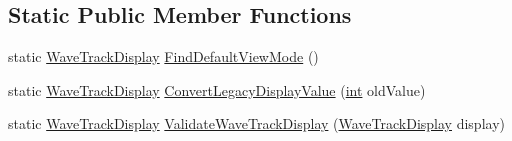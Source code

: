\subsection*{Static Public Member Functions}
\begin{DoxyCompactItemize}
\item 
static \hyperlink{class_wave_track_a084eba52413a5cc74d2634b36e2f85b5}{Wave\+Track\+Display} \hyperlink{class_wave_track_a92b3b5c624dbac625e25d5335afcd7a5}{Find\+Default\+View\+Mode} ()
\item 
static \hyperlink{class_wave_track_a084eba52413a5cc74d2634b36e2f85b5}{Wave\+Track\+Display} \hyperlink{class_wave_track_a7129f7e9044f717d60ae824d3ab156fc}{Convert\+Legacy\+Display\+Value} (\hyperlink{xmltok_8h_a5a0d4a5641ce434f1d23533f2b2e6653}{int} old\+Value)
\item 
static \hyperlink{class_wave_track_a084eba52413a5cc74d2634b36e2f85b5}{Wave\+Track\+Display} \hyperlink{class_wave_track_a2c0fdb366755a9100946fd7d0c4fae15}{Validate\+Wave\+Track\+Display} (\hyperlink{class_wave_track_a084eba52413a5cc74d2634b36e2f85b5}{Wave\+Track\+Display} display)
\end{DoxyCompactItemize}

